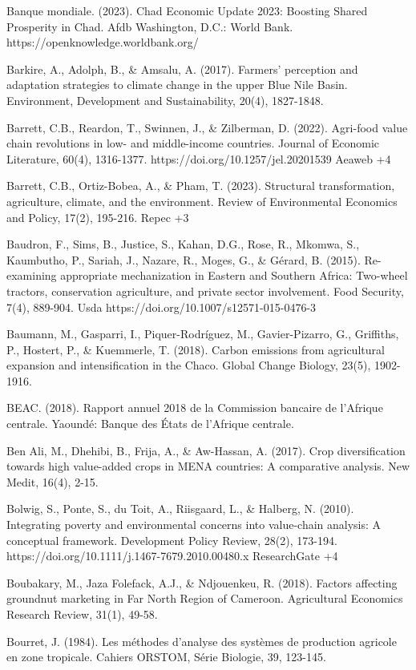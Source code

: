 \documentclass[12pt,oneside]{report}
\begin{document}
Banque mondiale. (2023). Chad Economic Update 2023: Boosting Shared Prosperity in Chad. Afdb Washington, D.C.: World Bank. https://openknowledge.worldbank.org/

Barkire, A., Adolph, B., \& Amsalu, A. (2017). Farmers' perception and adaptation strategies to climate change in the upper Blue Nile Basin. Environment, Development and Sustainability, 20(4), 1827-1848.

Barrett, C.B., Reardon, T., Swinnen, J., \& Zilberman, D. (2022). Agri-food value chain revolutions in low- and middle-income countries. Journal of Economic Literature, 60(4), 1316-1377. https://doi.org/10.1257/jel.20201539 Aeaweb +4

Barrett, C.B., Ortiz-Bobea, A., \& Pham, T. (2023). Structural transformation, agriculture, climate, and the environment. Review of Environmental Economics and Policy, 17(2), 195-216. Repec +3

Baudron, F., Sims, B., Justice, S., Kahan, D.G., Rose, R., Mkomwa, S., Kaumbutho, P., Sariah, J., Nazare, R., Moges, G., \& Gérard, B. (2015). Re-examining appropriate mechanization in Eastern and Southern Africa: Two-wheel tractors, conservation agriculture, and private sector involvement. Food Security, 7(4), 889-904. Usda https://doi.org/10.1007/s12571-015-0476-3

Baumann, M., Gasparri, I., Piquer-Rodríguez, M., Gavier-Pizarro, G., Griffiths, P., Hostert, P., \& Kuemmerle, T. (2018). Carbon emissions from agricultural expansion and intensification in the Chaco. Global Change Biology, 23(5), 1902-1916.

BEAC. (2018). Rapport annuel 2018 de la Commission bancaire de l'Afrique centrale. Yaoundé: Banque des États de l'Afrique centrale.

Ben Ali, M., Dhehibi, B., Frija, A., \& Aw-Hassan, A. (2017). Crop diversification towards high value-added crops in MENA countries: A comparative analysis. New Medit, 16(4), 2-15.

Bolwig, S., Ponte, S., du Toit, A., Riisgaard, L., \& Halberg, N. (2010). Integrating poverty and environmental concerns into value-chain analysis: A conceptual framework. Development Policy Review, 28(2), 173-194. https://doi.org/10.1111/j.1467-7679.2010.00480.x ResearchGate +4

Boubakary, M., Jaza Folefack, A.J., \& Ndjouenkeu, R. (2018). Factors affecting groundnut marketing in Far North Region of Cameroon. Agricultural Economics Research Review, 31(1), 49-58.

Bourret, J. (1984). Les méthodes d'analyse des systèmes de production agricole en zone tropicale. Cahiers ORSTOM, Série Biologie, 39, 123-145.
\end{document}
